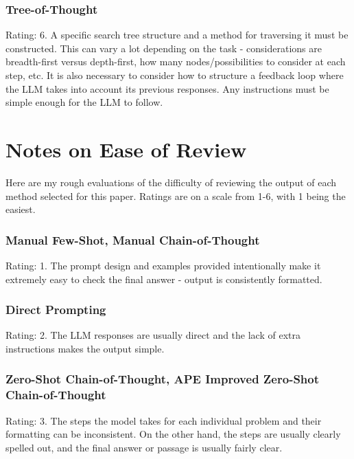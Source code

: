 \documentclass[11pt]{article}
\begin{document}
\subsubsection*{Tree-of-Thought}

Rating: 6. A specific search tree structure and a method for traversing it must be constructed. This can vary a lot depending on the task - considerations are breadth-first versus depth-first, how many nodes/possibilities to consider at each step, etc. It is also necessary to consider how to structure a feedback loop where the LLM takes into account its previous responses. Any instructions must be simple enough for the LLM to follow.

\clearpage
\newpage

\section{Notes on Ease of Review}
\label{sec:ease_of_review}

Here are my rough evaluations of the difficulty of reviewing the output of each method selected for this paper. Ratings are on a scale from 1-6, with 1 being the easiest.

\subsubsection*{Manual Few-Shot, Manual Chain-of-Thought}

Rating: 1. The prompt design and examples provided intentionally make it extremely easy to check the final answer - output is consistently formatted.

\subsubsection*{Direct Prompting}

Rating: 2. The LLM responses are usually direct and the lack of extra instructions makes the output simple. 

\subsubsection*{Zero-Shot Chain-of-Thought, APE Improved Zero-Shot Chain-of-Thought}

Rating: 3. The steps the model takes for each individual problem and their formatting can be inconsistent. On the other hand, the steps are usually clearly spelled out, and the final answer or passage is usually fairly clear.
\end{document}
